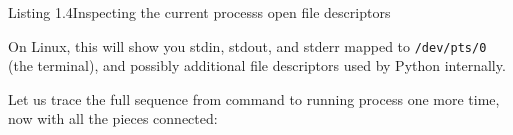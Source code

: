 \begin{codeboxcap}[short]{\textcolor{accent}{Listing 1.4}\enspace Inspecting the current process\textquotesingle s open file descriptors}

\begin{Shaded}
\begin{Highlighting}[]

\OperatorTok{=} \SpecialCharTok{\{}\SpecialCharTok{\}}
\NormalTok{:}
        \NormalTok{:}
\OperatorTok{=}\SpecialCharTok{\{}\SpecialCharTok{\}}\SpecialStringTok{/}\SpecialCharTok{\{}\SpecialCharTok{\}}\NormalTok{)}
            \NormalTok{(}\SpecialCharTok{\{}\SpecialCharTok{\}}\SpecialStringTok{ {-}\textgreater{} }\SpecialCharTok{\{}\SpecialCharTok{\}}\NormalTok{)}
         \NormalTok{:}
 \NormalTok{:}
    \NormalTok{(}\NormalTok{)}
    \NormalTok{(}\SpecialCharTok{\{}\SpecialCharTok{\}}\NormalTok{)}
\end{Highlighting}
\end{Shaded}

\end{codeboxcap}

\noindent{}On Linux, this will show you stdin, stdout, and stderr mapped to \texttt{/dev/pts/0} (the terminal), and possibly additional file descriptors used by Python internally.

\label{01-command-to-process:putting-it-together-the-complete-startup-sequence}

Let us trace the full sequence from command to running process one more time, now with all the pieces connected:

